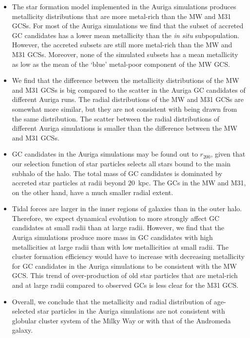 \documentclass[a4paper,fleqn,usenatbib]{mnras}
\begin{document}
\begin{itemize}
    \item The star formation model implemented in the Auriga simulations produces
    metallicity distributions that are more metal-rich than the MW and M31
    GCSs. For most of the Auriga simulations we find that the subset of accreted 
    GC candidates has a lower mean metallicity than the {\it in situ} subpopulation.
    However, the accreted subsets are still more metal-rich than the MW and M31 GCSs.
    Moreover, none of the simulated subsets has a mean metallicity as low as the mean
    of the `blue' metal-poor component of the MW GCS.

    \item We find that the difference between the metallicity distributions of 
    the MW and M31 GCSs is big compared to the scatter in the Auriga GC candidates 
    of different Auriga runs. The radial distributions of the MW and M31 GCSs are
    somewhat more similar, but they are not consistent with being drawn from the
    same distribution. The scatter between the radial distributions of different
    Auriga simulations is smaller than the difference between the MW and M31 GCSs.

    \item GC candidates in the Auriga simulations may be found out to $r_{200}$,
    given that our selection function of star particles selects all stars bound
    to the main subhalo of the halo. The total mass of GC candidates is 
    dominated by accreted star particles at radii beyond $20$~kpc. The GCs in 
    the MW and M31, on the other hand, have a much smaller radial extent.

    \item Tidal forces are larger in the inner regions of galaxies than in the
    outer halo. Therefore, we expect dynamical evolution to more strongly affect 
    GC candidates at small radii than at large radii. However,
    we find that the Auriga simulations produce more mass in GC candidates with
    high metallicities at large radii than with low metallicities at small radii.
    The cluster formation efficiency would have to increase with decreasing
    metallicity for GC candidates in the Auriga simulations to be consistent
    with the MW GCS. This trend of over-production of old star particles that 
    are metal-rich and at large radii compared to observed GCs is less clear for 
    the M31 GCS.

    \item
    Overall, we conclude that the metallicity and radial distribution of age-selected
    star particles in the Auriga simulations are not consistent with globular 
    cluster system of the Milky Way or with that of the Andromeda galaxy.


\end{itemize}
\end{document}
